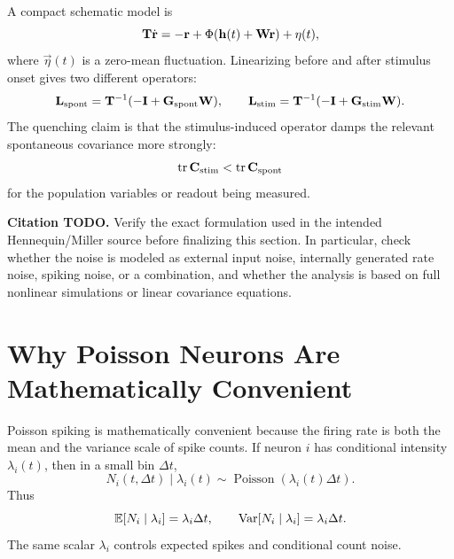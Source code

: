 A compact schematic model is
%
\begin{equation}
  \mathbf{T}\dot{\mathbf{r}}
  =
  -\mathbf{r}+\Phi(\mathbf{h}(t)+\mathbf{W}\mathbf{r})
  +
  \mathbf{\eta}(t),
  \label{eq:stochastic-ssn-schematic}
\end{equation}
%
where $\vec \eta(t)$ is a zero-mean fluctuation. Linearizing before and after stimulus onset gives two different operators:
%
\begin{equation}
  \mathbf{L}_{\mathrm{spont}}
  =
  \mathbf{T}^{-1}(-\mathbf{I}+\mathbf{G}_{\mathrm{spont}}\mathbf{W}),
  \qquad
  \mathbf{L}_{\mathrm{stim}}
  =
  \mathbf{T}^{-1}(-\mathbf{I}+\mathbf{G}_{\mathrm{stim}}\mathbf{W}).
  \label{eq:ssn-two-linear-operators}
\end{equation}
%
The quenching claim is that the stimulus-induced operator damps the relevant spontaneous covariance more strongly:
%
\begin{equation}
  \operatorname{tr}\mathbf{C}_{\mathrm{stim}}
  <
  \operatorname{tr}\mathbf{C}_{\mathrm{spont}}
  \label{eq:ssn-covariance-quench}
\end{equation}
%
for the population variables or readout being measured.

\noindent\textbf{Citation TODO.} Verify the exact formulation used in the intended Hennequin/Miller source before finalizing this section. In particular, check whether the noise is modeled as external input noise, internally generated rate noise, spiking noise, or a combination, and whether the analysis is based on full nonlinear simulations or linear covariance equations.

\section{Why Poisson Neurons Are Mathematically Convenient}
\label{sec:why-poisson-neurons-convenient-ssn}

Poisson spiking is mathematically convenient because the firing rate is both the mean and the variance scale of spike counts. If neuron $i$ has conditional intensity $\lambda_i(t)$, then in a small bin $\Delta t$,
%
\begin{equation}
  N_i(t,\Delta t)\mid \lambda_i(t)
  \sim
  \operatorname{Poisson}(\lambda_i(t)\Delta t).
  \label{eq:ssn-poisson-bin}
\end{equation}
%
Thus
%
\begin{equation}
  \mathbb{E}[N_i\mid \lambda_i]=\lambda_i\Delta t,
  \qquad
  \operatorname{Var}[N_i\mid \lambda_i]=\lambda_i\Delta t.
  \label{eq:ssn-poisson-mean-variance}
\end{equation}
%
The same scalar $\lambda_i$ controls expected spikes and conditional count noise.

